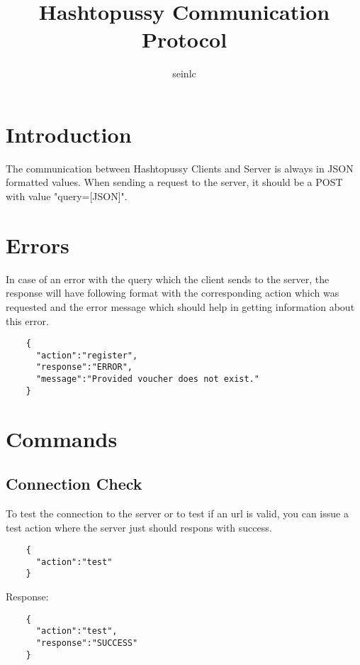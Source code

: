 \documentclass{article}
\author{seinlc}
\begin{document}
	\title{Hashtopussy Communication Protocol}
	\maketitle
	\section*{Introduction}
	The communication between Hashtopussy Clients and Server is always in JSON formatted values. When sending a request to the server, it should be a POST with value
	"query=[JSON]".

	\section*{Errors}
	In case of an error with the query which the client sends to the server, the response will have following format with the corresponding action which was requested and the error message which should help in getting information about this error.
	\begin{verbatim}
	{
	  "action":"register",
	  "response":"ERROR",
	  "message":"Provided voucher does not exist."
	}
	\end{verbatim}
	\pagebreak
	\section*{Commands}
	
	\subsection*{Connection Check}
	To test the connection to the server or to test if an url is valid, you can issue a test action where the server just should respons with success.
	\begin{verbatim}
	{
	  "action":"test"
	}
	\end{verbatim}
	Response:
	\begin{verbatim}
	{
	  "action":"test",
	  "response":"SUCCESS"
	} 
	\end{verbatim}
\end{document}
